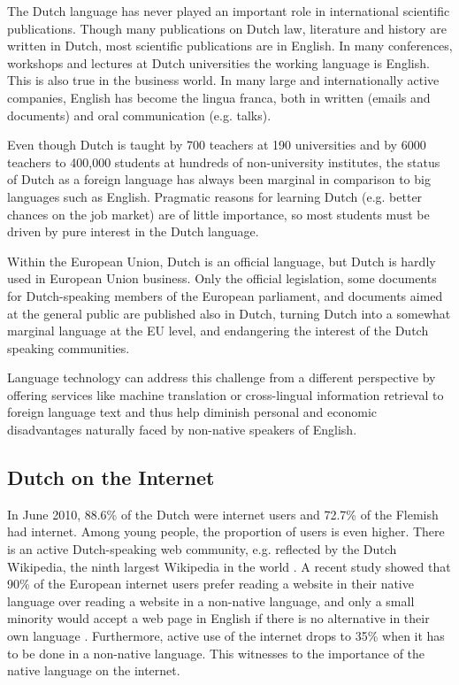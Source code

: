 \documentclass[]{../../metanetpaper}
\begin{document}
\begin{multicols}{2}
    The Dutch language has never played an important role in international scientific publications. Though many publications on Dutch law, literature and history are written in Dutch, most scientific publications are in English. In many conferences, workshops and lectures at Dutch universities the working language is English. This is also true in the business world. In many large and internationally active companies, English has become the lingua franca, both in written (emails and documents) and oral communication (e.g. talks).


    Even though Dutch is taught by 700 teachers at 190 universities and by 6000 teachers to 400,000 students at hundreds of non-university institutes, the status of Dutch as a foreign language has always been marginal in comparison to big languages such as English. Pragmatic reasons for learning Dutch (e.g. better chances on the job market) are of little importance, so most students must be driven by pure interest in the Dutch language.

    Within the European Union, Dutch is an official language, but Dutch is hardly used in European Union business. Only the official legislation, some documents for Dutch-speaking members of the European parliament, and documents aimed at the general public are published also in Dutch, turning Dutch into a somewhat marginal language at the EU level, and endangering the interest of the Dutch speaking communities.

    Language technology can address this challenge from a different perspective by offering services like machine translation or cross-lingual information retrieval to foreign language text and thus help diminish personal and economic disadvantages naturally faced by non-native speakers of English.

\subsection{Dutch on the Internet}

  In June 2010, 88.6\% of the Dutch \cite{Internetworldstats} were internet users and 72.7\% of the Flemish  \cite{VRIND} had internet. Among young people, the proportion of users is even higher. There is an active Dutch-speaking web community, e.g. reflected by the Dutch Wikipedia, the ninth largest Wikipedia in the world \cite{Wikipedia}.  A recent study showed that 90\% of the European internet users prefer reading a website in their native language over reading a website in a non-native language, and only a small minority would accept a web page in English if there is no alternative in their own language \cite{Flash}. Furthermore, active use of the internet drops to 35\% when it has to be done in a non-native language. This witnesses to the importance of the native language on the internet.


\end{multicols}
\end{document}
